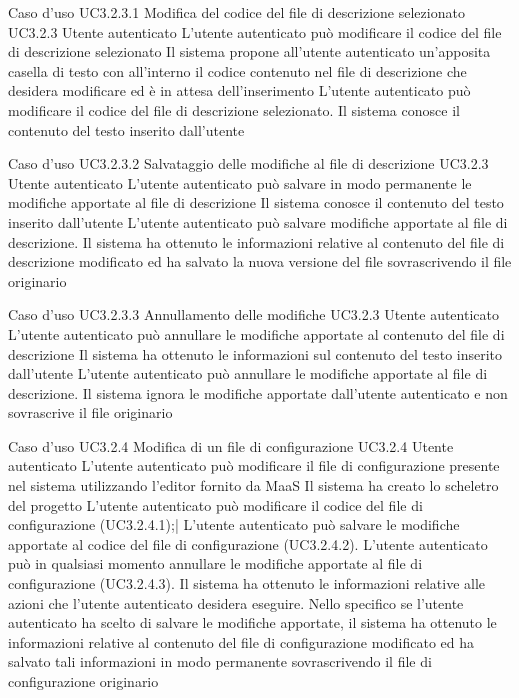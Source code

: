 \UCtitle
{Caso d'uso UC3.2.3.1}
{Modifica del codice del file di descrizione selezionato}
\UC
{UC3.2.3}
{Utente autenticato}
{L'utente autenticato può modificare il codice del file di descrizione selezionato}
{Il sistema propone all'utente autenticato un'apposita casella di testo con all'interno il codice contenuto nel file di descrizione che desidera modificare ed è in attesa dell'inserimento}
\scenario
{L'utente autenticato può modificare il codice del file di descrizione selezionato.}
\post
{Il sistema conosce il contenuto del testo inserito dall'utente}

\UCtitle
{Caso d'uso UC3.2.3.2}
{Salvataggio delle modifiche al file di descrizione}
\UC
{UC3.2.3}
{Utente autenticato}
{L'utente autenticato può salvare in modo permanente le modifiche apportate al file di descrizione}
{Il sistema conosce il contenuto del testo inserito dall'utente}
\scenario
{L'utente autenticato può salvare modifiche apportate al file di descrizione.}
\post
{Il sistema ha ottenuto le informazioni relative al contenuto del file di descrizione modificato ed ha salvato la nuova versione del file sovrascrivendo il file originario}

\UCtitle
{Caso d'uso UC3.2.3.3}
{Annullamento delle modifiche}
\UC
{UC3.2.3}
{Utente autenticato}
{L'utente autenticato può annullare le modifiche apportate al contenuto del file di descrizione}
{Il sistema ha ottenuto le informazioni sul contenuto del testo inserito dall'utente}
\scenario
{L'utente autenticato può annullare le modifiche apportate al file di descrizione.}
\post
{Il sistema ignora le modifiche apportate dall'utente autenticato e non sovrascrive il file originario}


\UCtitle
{Caso d'uso UC3.2.4}
{Modifica di un file di configurazione}
\UC
{UC3.2.4}
{Utente autenticato}
{L'utente autenticato può modificare il file di configurazione presente nel sistema utilizzando l'editor fornito da MaaS}
{Il sistema ha creato lo scheletro del progetto}
\scenario
{L'utente autenticato può modificare il codice del file di configurazione (UC3.2.4.1);|
L'utente autenticato può salvare le modifiche apportate al codice del file di configurazione (UC3.2.4.2).
}
\estensioni
{L'utente autenticato può in qualsiasi momento annullare le modifiche apportate al file di configurazione (UC3.2.4.3).}
\post
{Il sistema ha ottenuto le informazioni relative alle azioni che l'utente autenticato desidera eseguire. Nello specifico se l'utente autenticato ha scelto di salvare le modifiche apportate, il sistema ha ottenuto le informazioni relative al contenuto del file di configurazione modificato ed ha salvato tali informazioni in modo permanente sovrascrivendo il file di configurazione originario}

